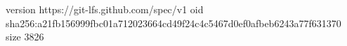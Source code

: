 version https://git-lfs.github.com/spec/v1
oid sha256:a21fb156999fbc01a712023664cd49f24c4c5467d0ef0afbeb6243a77f631370
size 3826
